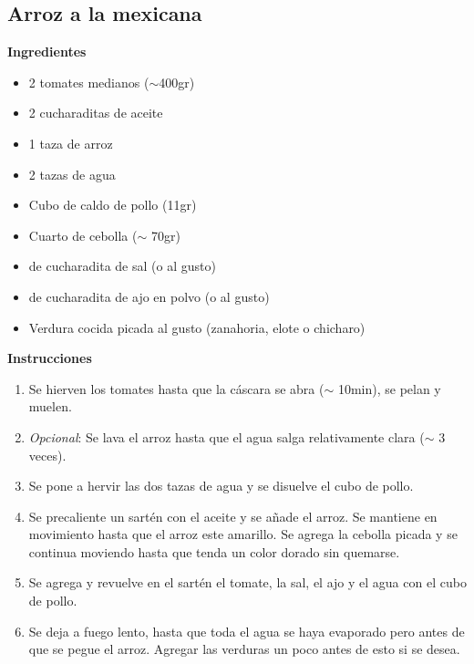 \subsection{Arroz a la mexicana}
\textbf{Ingredientes}
\begin{itemize}
\item 2 tomates medianos ($\sim$400gr)
\item 2 cucharaditas de aceite
\item 1 taza de arroz
\item 2 tazas de agua
\item Cubo de caldo de pollo (11gr)
\item Cuarto de cebolla ($\sim$ 70gr)
\item {} de cucharadita de sal (o al gusto)
\item {} de cucharadita de ajo en polvo (o al gusto)
\item Verdura cocida picada al gusto (zanahoria, elote o chicharo)
\end{itemize}

\textbf{Instrucciones}
\begin{enumerate}
\item Se hierven los tomates hasta que la cáscara se abra ($\sim$ 10min), se pelan y muelen.
\item \textit{Opcional}: Se lava el arroz hasta que el agua salga relativamente clara ($\sim$ 3 veces).
\item Se pone a hervir las dos tazas de agua y se disuelve el cubo de pollo.
\item Se precaliente un sartén con el aceite y se añade el arroz. Se mantiene en movimiento hasta que el arroz este amarillo. Se agrega la cebolla picada y se continua moviendo hasta que tenda un color dorado sin quemarse.
\item Se agrega y revuelve en el sart\'en el tomate, la sal, el ajo y el agua con el cubo de pollo.
\item Se deja a fuego lento, hasta que toda el agua se haya evaporado pero antes de que se pegue el arroz. Agregar las verduras un poco antes de esto si se desea.
\end{enumerate}
